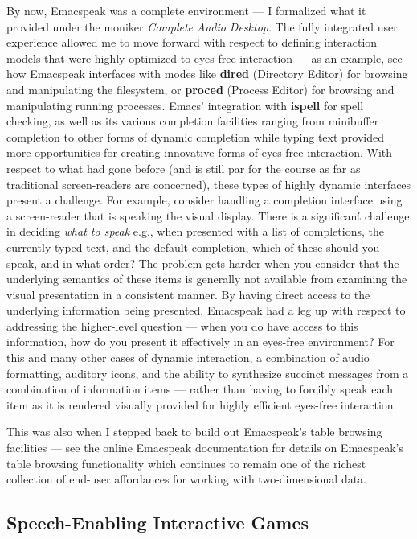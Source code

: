 \documentclass[11pt]{article}
\begin{document}
By now, Emacspeak was a complete environment — I formalized what
it provided under the moniker \emph{Complete Audio Desktop}. The fully
integrated user experience allowed me to move forward with
respect to defining interaction models that were highly optimized
to eyes-free interaction — as an example, see how Emacspeak
interfaces with modes like \textbf{dired} (Directory Editor) for
browsing and manipulating the filesystem, or \textbf{proced} (Process
Editor) for browsing and manipulating running processes. Emacs'
integration with \textbf{ispell} for spell checking, as well as its
various completion facilities ranging from minibuffer completion
to other forms of dynamic completion while typing text provided
more opportunities for creating innovative forms of eyes-free
interaction. With respect to what had gone before (and is still
par for the course as far as traditional screen-readers are
concerned), these types of highly dynamic interfaces present a
challenge. For example, consider handling a completion interface
using a screen-reader that is speaking the visual display. There
is a significan\'t challenge in deciding \emph{what to speak} e.g., when
presented with a list of completions, the currently typed text,
and the default completion, which of these should you speak, and
in what order? The problem gets harder when you consider that the
underlying semantics of these items is generally not available
from examining the visual presentation in a consistent manner. By
having direct access to the underlying information being
presented, Emacspeak had a leg up with respect to addressing the
higher-level question — when you do have access to this
information, how do you present it effectively in an eyes-free
environment? For this and many other cases of dynamic
interaction, a combination of audio formatting, auditory icons,
and the ability to synthesize succinct messages from a
combination of information items — rather than having to forcibly
speak each item as it is rendered visually provided for highly
efficient eyes-free interaction.


This was also when I stepped back to build out Emacspeak's table
browsing facilities — see the online Emacspeak documentation for
details on Emacspeak's table browsing functionality which
continues to remain one of the richest collection of end-user
affordances for working with two-dimensional data.

\subsection{Speech-Enabling Interactive Games}
\label{sec-9-1}
\end{document}
